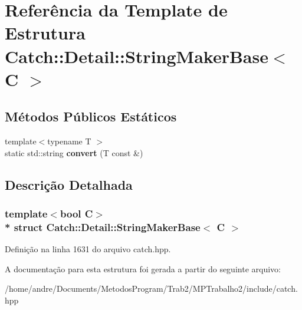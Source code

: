 \hypertarget{structCatch_1_1Detail_1_1StringMakerBase}{}\section{Referência da Template de Estrutura Catch\+:\+:Detail\+:\+:String\+Maker\+Base$<$ C $>$}
\label{structCatch_1_1Detail_1_1StringMakerBase}
\subsection*{Métodos Públicos Estáticos}
\begin{DoxyCompactItemize}
\item 
{\footnotesize template$<$typename T $>$ }\\static std\+::string {\bfseries convert} (T const \&)\hypertarget{structCatch_1_1Detail_1_1StringMakerBase_a8eb9f635dc413a5758e22614bafaf1a3}{}\label{structCatch_1_1Detail_1_1StringMakerBase_a8eb9f635dc413a5758e22614bafaf1a3}

\end{DoxyCompactItemize}


\subsection{Descrição Detalhada}
\subsubsection*{template$<$bool C$>$\\*
struct Catch\+::\+Detail\+::\+String\+Maker\+Base$<$ C $>$}



Definição na linha 1631 do arquivo catch.\+hpp.



A documentação para esta estrutura foi gerada a partir do seguinte arquivo\+:\begin{DoxyCompactItemize}
\item 
/home/andre/\+Documents/\+Metodos\+Program/\+Trab2/\+M\+P\+Trabalho2/include/catch.\+hpp\end{DoxyCompactItemize}
